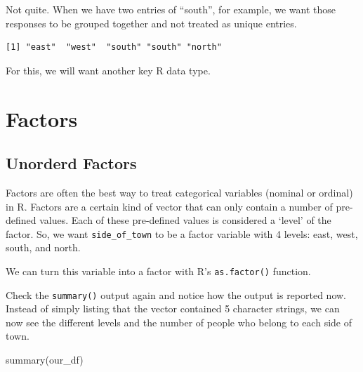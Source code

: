 \documentclass[
  letterpaper,
  DIV=11,
  numbers=noendperiod]{scrreprt}
\newenvironment{Shaded}{\begin{snugshade}}{\end{snugshade}}
\newcommand{\FunctionTok}[1]{\textcolor[rgb]{0.28,0.35,0.67}{#1}}
\newcommand{\NormalTok}[1]{\textcolor[rgb]{0.00,0.23,0.31}{#1}}
\newcommand{\OtherTok}[1]{\textcolor[rgb]{0.00,0.23,0.31}{#1}}
\newcommand{\SpecialCharTok}[1]{\textcolor[rgb]{0.37,0.37,0.37}{#1}}
\begin{document}
Not quite. When we have two entries of ``south'', for example, we want
those responses to be grouped together and not treated as unique
entries.

\begin{Shaded}
\end{Shaded}

\begin{verbatim}
[1] "east"  "west"  "south" "south" "north"
\end{verbatim}

For this, we will want another key R data type.

\section{Factors}\label{factors}

\subsection{Unorderd Factors}\label{unorderd-factors}

Factors are often the best way to treat categorical variables (nominal
or ordinal) in R. Factors are a certain kind of vector that can only
contain a number of pre-defined values. Each of these pre-defined values
is considered a `level' of the factor. So, we want
\texttt{side\_of\_town} to be a factor variable with 4 levels: east,
west, south, and north.

We can turn this variable into a factor with R's \texttt{as.factor()}
function.

\begin{Shaded}
\end{Shaded}

Check the \texttt{summary()} output again and notice how the output is
reported now. Instead of simply listing that the vector contained 5
character strings, we can now see the different levels and the number of
people who belong to each side of town.

\begin{Shaded}
\begin{Highlighting}[]
\FunctionTok{summary}\NormalTok{(our\_df)}
\end{Highlighting}
\end{Shaded}
\end{document}
